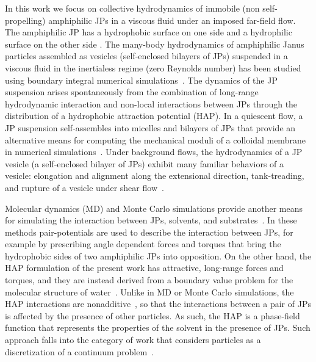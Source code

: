 \documentclass[prb,preprint,showpacs,preprintnumbers,amsmath,amssymb,longbibliography]{revtex4-2}
\begin{document}
In this work we focus on collective hydrodynamics of immobile (non self-propelling)
amphiphilic JPs in a viscous fluid under an imposed far-field flow. The
amphiphilic JP has a hydrophobic surface on one side and a hydrophilic
surface on the other side \cite{doi:10.1021/la503455h}. The many-body
hydrodynamics of amphiphilic Janus particles assembled as vesicles
(self-enclosed bilayers of JPs) suspended in a viscous fluid in the
inertialess regime (zero Reynolds number) has been studied using
boundary integral numerical simulations~\cite{Fu20,Fu2022_JFM}. The
dynamics of the JP suspension arises spontaneously from the combination of long-range
hydrodynamic interaction and non-local interactions between JPs through
the distribution of a hydrophobic attraction potential (HAP).
%
In a quiescent flow, a JP suspension self-assembles into micelles and
bilayers of JPs that provide an alternative means for computing the
mechanical moduli of a colloidal membrane in numerical
simulations~\cite{NaTr00, Fu20, KrFiGuKaHa13}. Under background flows,
the hydrodynamics of a JP vesicle (a self-enclosed bilayer of JPs)
exhibit many familiar behaviors of a vesicle: elongation and alignment
along the extensional direction, tank-treading, and rupture of a vesicle
under shear flow~\cite{Fu2022_JFM, grandmaison_brancherie_salsac_2021,
D2SM00179A,keller_skalak_1982, Finken08, Shaqfeh11}.

Molecular dynamics (MD) and Monte Carlo simulations provide another
means for simulating the interaction between JPs, solvents, and
substrates~\cite{Brandner2019, Baniketal2021,
HongCacciutoLuijtenGranick2008, C9NR05885K}. In these methods
pair-potentials are used to describe the interaction between JPs, for
example by prescribing angle dependent forces and torques that bring the
hydrophobic sides of two amphiphilic JPs into opposition. On the other
hand, the HAP formulation of the present work has attractive, long-range
forces and torques, and they are instead derived from a boundary value
problem for the molecular structure of water~\cite{Ma77, GoHaKo94,
ErLjCl89, Lietal05, Israelachvili80}. Unlike in MD or Monte Carlo
simulations, the HAP interactions are nonadditive~\cite{Fu20}, so that
the interactions between a pair of JPs is affected by the presence of
other particles. As such, the HAP is a phase-field function that
represents the properties of the solvent in the presence of JPs. Such
approach falls into the category of work that considers particles as a
discretization of a continuum problem~\cite{HongWang2021_arXiv}.
\end{document}
